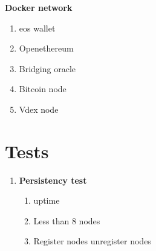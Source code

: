 \documentclass[]{article}
\begin{document}
   \textbf{Docker network}\\
  \begin{enumerate}
  	\item eos wallet
  	\item Openethereum
  	\item Bridging oracle
  	\item Bitcoin node
  	\item Vdex node
  \end{enumerate}

\section{Tests}
					\begin{enumerate}
						\item \textbf{Persistency test}
							\begin{enumerate}
								\item uptime\textit{}
								\item Less than 8 nodes 
								\item Register nodes unregister nodes	
							\end{enumerate}
				\end{enumerate}
			
\end{document}
